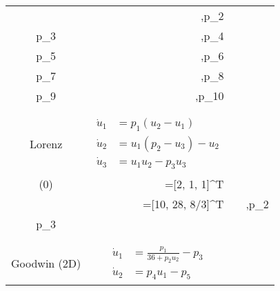 \begin{table}[H]
{\begin{tabular}{crcc}
\begin{minipage}{4cm}
\begin{aligned}
		p_1&\in[0,20],\;p_2\in[0,20]\\
		p_3&\in[0,60],\;p_4\in[0,20]\\
		p_5&\in[0,20],\;p_6\in[0,100]\\
		p_7&\in[0,20],\;p_8\in[0,1]\\
		p_9&\in[0,1],\;p_{10}\in[0,1]
	\end{aligned}\) \end{minipage} \\\\[-5pt]
	\hline 
	\\[-5pt]
	Lorenz & \begin{minipage}{5.5cm} 
		\begin{equation} \label{eq:lorenz}
			\begin{aligned}
				\dot{u}_1 &= p_1(u_2-u_1) \\ 
				\dot{u}_2 &= u_1(p_2-u_3)-u_2 \\ 
				\dot{u}_3 &= u_1 u_2-p_3 u_3
			\end{aligned}
		\end{equation}
	\end{minipage} & 
	\begin{minipage}{5cm} \(\begin{aligned}
		 t&\in[0,10]\\
		\state(0)&=[2, 1, 1]^T \\
		 \trueParams&=[10, 28, 8/3]^T
	\end{aligned}\) \end{minipage} & \begin{minipage}{4cm} \(\begin{aligned}
		p_1&\in [0,20],\;p_2\in [0,35]\\
		p_3&\in [0, 5]
	\end{aligned}\) \end{minipage} \\\\[-5pt]
	\hline 
	\\[-5pt]
	Goodwin (2D) & \begin{minipage}{5cm} 
		\begin{equation} \label{eq:goodwin2d}
			\begin{aligned}
				\dot{u}_1 &= \frac{p_1}{36 + p_2u_2} - p_3 \\
				\dot{u}_2 &= p_4 u_1 - p_5
			\end{aligned}
		\end{equation}
	\end{minipage} & 
	\begin{minipage}{5cm} 
		\(\begin{aligned}

\end{aligned}
\end{minipage}
\end{tabular}}
\end{table}
